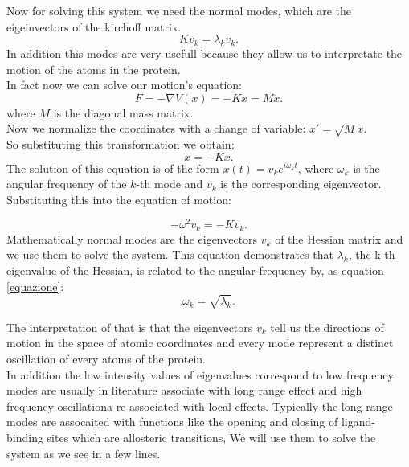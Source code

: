 \documentclass[English, Lau, oneside]{sapthesis}
\begin{document}
Now for solving this system we need the normal modes, which are the eigeinvectors of the kirchoff matrix.
\begin{equation}
    {K} {v}_k = \lambda_k {v}_k. \label{equazione}
\end{equation}
In addition this modes are very usefull because they allow us to interpretate the motion of the atoms in the protein.\\
In fact now we can solve our motion's equation:
\begin{equation}
{F} = -\nabla V({x}) = -{K} {x} = {M} \ddot{{x}}.
\end{equation}
where \( {M} \) is the diagonal mass matrix.\\
Now we normalize the coordinates with a change of variable: \( {x}' = \sqrt{M} {x}\). \\
So substituting this transformation we obtain:
\begin{equation}
\ddot{{x}} = -{K} {x}.
\end{equation}
The solution of this equation is of the form \( {x}(t) = {v}_k e^{i \omega_k t} \), where \( \omega_k \) is the angular frequency of the \( k \)-th mode and \( {v}_k \) is the corresponding eigenvector.\\
Substituting this into the equation of motion:

\begin{equation}
-\omega^2 {v}_k = -{K} {v}_k.
\end{equation}
Mathematically normal modes are the eigenvectors \( {v}_k \) of the Hessian matrix and we use them to solve the system. 
This equation demonstrates that \( \lambda_k \), the k-th eigenvalue of the Hessian, is related to the angular frequency by, as equation \ref{equazione}:
\begin{equation}
    \omega_k = \sqrt{\lambda_k}.
\end{equation}

The interpretation of that is that the eigenvectors \( {v}_k \) tell us the directions of motion in the space of atomic coordinates and every mode represent a distinct oscillation of every atoms of the protein.\\
In addition the low intensity values of eigenvalues correspond to low frequency modes are usually in literature associate with long range effect and high frequency oscillationa re associated with local effects.
Typically the long range modes are assocaited with functions like the opening and closing of ligand-binding sites which are  allosteric transitions, 
We will use them to solve the system as we see in a few lines.\\
\end{document}
